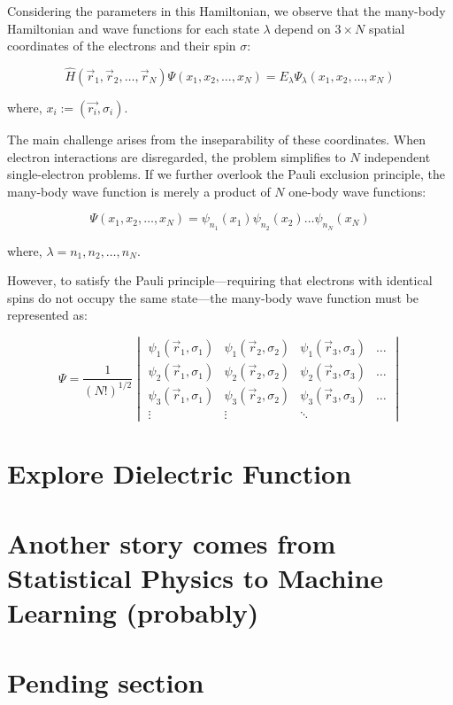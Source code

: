 Considering the parameters in this Hamiltonian, we observe that the many-body Hamiltonian and wave functions for each state $\lambda$ depend on $3 \times N$ spatial coordinates of the electrons and their spin $\sigma$:

\begin{equation}
    \hat{H}(\Vec{r}_1,\Vec{r}_2,\dots,\Vec{r}_N)\Psi(x_1,x_2,\dots,x_N)
    = E_\lambda\Psi_\lambda(x_1,x_2,\dots,x_N)
    \label{many_body_hamiltonian_argument}
\end{equation}

where, $x_i:=(\Vec{r_i},\sigma_i)$.

The main challenge arises from the inseparability of these coordinates. When electron interactions are disregarded, the problem simplifies to 
$N$ independent single-electron problems. If we further overlook the Pauli exclusion principle, the many-body wave function is merely a product of 
$N$ one-body wave functions:

\begin{equation}
    \Psi(x_1,x_2,\dots,x_N)=\psi_{n_1}(x_1)\psi_{n_2}(x_2)\dots\psi_{n_N}(x_N)
    \label{body_function}
\end{equation}

where, $\lambda={n_1,n_2,\dots,n_N}$.

However, to satisfy the Pauli principle—requiring that electrons with identical spins do not occupy the same state—the many-body wave function must be represented as:

\begin{equation}
    \Psi = \frac{1}{(N!)^{1/2}}
    \begin{vmatrix}
    \psi_1(\Vec{r}_1,\sigma_1) & \psi_1(\Vec{r}_2,\sigma_2) & \psi_1(\Vec{r}_3,\sigma_3) & \dots \\
    \psi_2(\Vec{r}_1,\sigma_1) & \psi_2(\Vec{r}_2,\sigma_2) & \psi_2(\Vec{r}_3,\sigma_3) & \dots \\
    \psi_3(\Vec{r}_1,\sigma_1) & \psi_3(\Vec{r}_2,\sigma_2) & \psi_3(\Vec{r}_3,\sigma_3) & \dots \\
    \vdots & \vdots & \ddots
    \end{vmatrix}
\end{equation}

\section{Explore Dielectric Function}

\section{Another story comes from Statistical Physics to Machine Learning (probably)}

\section{Pending section}

